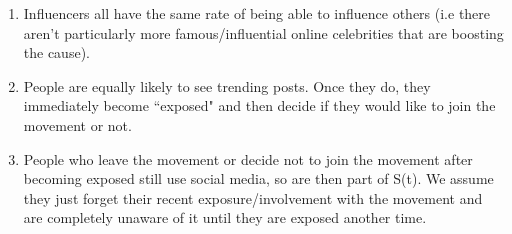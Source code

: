\documentclass{article}
\begin{document}
\begin{enumerate}
    \item Influencers all have the same rate of being able to influence others (i.e there aren’t particularly more famous/influential online celebrities that are boosting the cause). 

    \item People are equally likely to see trending posts. Once they do, they immediately become ``exposed" and then decide if they would like to join the movement or not. 
    
    \item People who leave the movement or decide not to join the movement after becoming exposed still use social media, so are then part of S(t). We assume they just forget their recent exposure/involvement with the movement and are completely unaware of it until they are exposed another time. 
    \end{enumerate}
\end{document}
